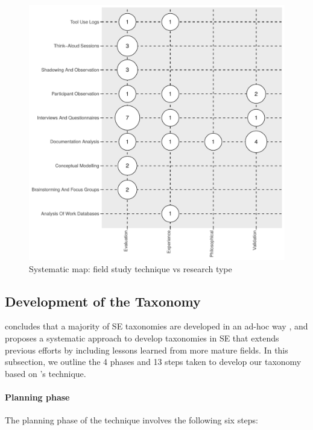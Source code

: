 \begin{figure}
  \centering
  \includegraphics[width=.55\linewidth]{sms}
  \caption{Systematic map: field study technique vs research type}
  \label{esem2019:fig:sms}
\end{figure}

\subsection{Development of the Taxonomy}
\label{esem2019:sec:method:taxonomy-development}

\citeauthor{Usman:2017hn} concludes that a majority of SE taxonomies are developed in an ad-hoc way \citep{Usman:2017hn}, and proposes a systematic approach to develop taxonomies in SE that extends previous efforts by including lessons learned from more mature fields. In this subsection, we outline the 4 phases and 13 steps taken to develop our taxonomy based on \citeauthor{Usman:2017hn}'s technique.

\paragraph{Planning phase} The planning phase of the technique involves the following six steps:


